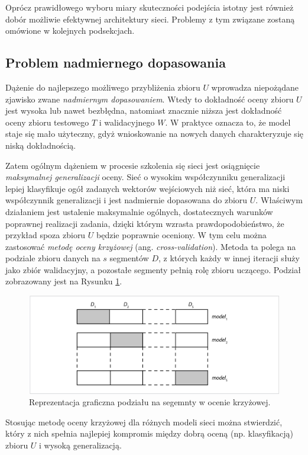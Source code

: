 Oprócz prawidłowego wyboru miary skuteczności podejścia istotny jest również dobór możliwie efektywnej architektury sieci. Problemy z tym związane zostaną omówione w kolejnych podsekcjach.

\subsection{Problem nadmiernego dopasowania}
\label{sec-overffiting}

Dążenie do najlepszego możliwego przybliżenia zbioru $U$ wprowadza niepożądane zjawisko zwane \textit{nadmiernym dopasowaniem}. Wtedy to dokładność oceny zbioru $U$ jest wysoka lub nawet bezbłędna, natomiast znacznie niższa jest dokładność oceny zbioru testowego $T$ i walidacyjnego $W$. W praktyce oznacza to, że model staje się mało użyteczny, gdyż wnioskowanie na nowych danych charakteryzuje się niską dokładnością.

Zatem ogólnym dążeniem w procesie szkolenia się sieci jest osiągnięcie \textit{maksymalnej generalizacji} oceny. Sieć o wysokim współczynniku generalizacji lepiej klasyfikuje ogół zadanych wektorów wejściowych niż sieć, która ma niski współczynnik generalizacji i jest nadmiernie dopasowana do zbioru $U$. Właściwym działaniem jest ustalenie maksymalnie ogólnych, dostatecznych warunków poprawnej realizacji zadania, dzięki którym wzrasta prawdopodobieństwo, że przykład spoza zbioru $U$ będzie poprawnie oceniony. W tym celu można zastosować \textit{metodę oceny krzyżowej} (ang. \textit{cross-validation}). Metoda ta polega na podziale zbioru danych na $s$ segmentów $D$, z których każdy w innej iteracji służy jako zbiór walidacyjny, a pozostałe segmenty pełnią rolę zbioru uczącego. Podział zobrazowany jest na Rysunku \ref{cross-validation}.
\begin{figure}[h!]
	\centering
	\includegraphics[width=1\textwidth]{figures/cross-validation.png}
	\caption{Reprezentacja graficzna podziału na segemnty w ocenie krzyżowej.}
	\label{cross-validation}
\end{figure}
Stosując metodę oceny krzyżowej dla różnych modeli sieci można stwierdzić, który z nich spełnia najlepiej kompromis między dobrą oceną (np. klasyfikacją) zbioru $U$ i wysoką generalizacją.

